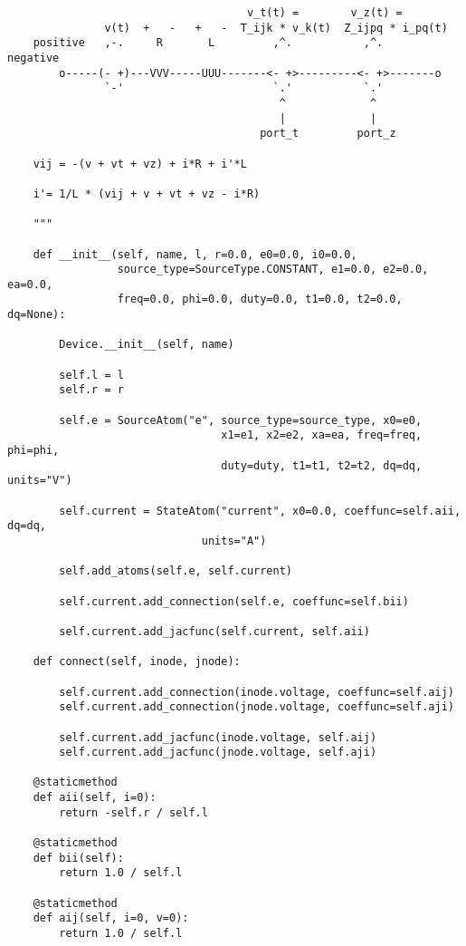 \begin{lstlisting}
                                     v_t(t) =        v_z(t) =
               v(t)  +   -   +   -  T_ijk * v_k(t)  Z_ijpq * i_pq(t)
    positive   ,-.     R       L         ,^.           ,^.      negative
        o-----(- +)---VVV-----UUU-------<- +>---------<- +>-------o
               `-'                       `.'           `.'
                                          ^             ^
                                          |             |
                                       port_t         port_z

    vij = -(v + vt + vz) + i*R + i'*L

    i'= 1/L * (vij + v + vt + vz - i*R)

    """

    def __init__(self, name, l, r=0.0, e0=0.0, i0=0.0,
                 source_type=SourceType.CONSTANT, e1=0.0, e2=0.0, ea=0.0,
                 freq=0.0, phi=0.0, duty=0.0, t1=0.0, t2=0.0, dq=None):

        Device.__init__(self, name)

        self.l = l
        self.r = r

        self.e = SourceAtom("e", source_type=source_type, x0=e0,
                                 x1=e1, x2=e2, xa=ea, freq=freq, phi=phi,
                                 duty=duty, t1=t1, t2=t2, dq=dq, units="V")

        self.current = StateAtom("current", x0=0.0, coeffunc=self.aii, dq=dq,
                              units="A")

        self.add_atoms(self.e, self.current)

        self.current.add_connection(self.e, coeffunc=self.bii)

        self.current.add_jacfunc(self.current, self.aii)

    def connect(self, inode, jnode):

        self.current.add_connection(inode.voltage, coeffunc=self.aij)
        self.current.add_connection(jnode.voltage, coeffunc=self.aji)

        self.current.add_jacfunc(inode.voltage, self.aij)
        self.current.add_jacfunc(jnode.voltage, self.aji)

    @staticmethod
    def aii(self, i=0):
        return -self.r / self.l

    @staticmethod
    def bii(self):
        return 1.0 / self.l

    @staticmethod
    def aij(self, i=0, v=0):
        return 1.0 / self.l


\end{lstlisting}
